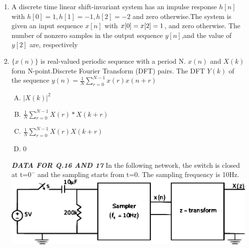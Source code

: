 \documentclass[journal,12pt,twocolumn]{IEEEtran}
\begin{document}
\begin{enumerate}
\item A discrete time linear shift-invariant system has an impulse response $h[n]$ with $h[0]=1,h[1]=-1, h[2]=-2$ and zero otherwise.The system is given an input sequence $x[n]$ with $x[0]=x[2]=\-1$, and zero otherwise. The number of nonzero samples in the output sequence $y[n]$,and the value of $y[2]$ are, respectively\\
\begin{enumerate}[(A)]
\end{enumerate}

\item $\{x(n)\}$ is real-valued periodic sequence with a period N. $x(n)$ and $X(k)$ form N-point.Discrete Fourier Transform (DFT) pairs. The DFT $Y(k)$ of the sequence $y(n)=\frac{1}{N}\sum_{r=0}^{N-1}x(r)x(n+r)$\\
\begin{enumerate}[(A)]

\setlength\itemsep{1em}

\item $
|X(k)|^{2}
$
\item $
\frac{1}{N}\sum_{r=0}^{N-1}X(r)*X(k+r)
$
\item $
\frac{1}{N}\sum_{r=0}^{N-1}X(r)X(k+r)
$
\item $
0
$\\


\end{enumerate}


\textbf{\textit{DATA FOR Q.16 AND 17}} In the following network, the switch is closed at t=$0^{-}$ and the sampling starts from t=0. The sampling frequency is 10Hz.\\

\includegraphics[scale=0.29]{fig8.eps}


\end{enumerate}
\end{document}
